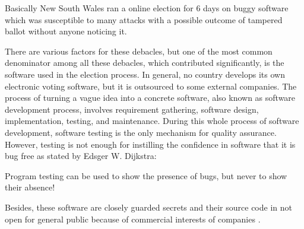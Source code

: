   \noindent
  Basically New South Wales ran a online election for 6 days on 
  buggy software which was susceptible to many attacks with a possible 
  outcome of tampered ballot without anyone noticing it. 
%  
%   
   
   There are various factors for these debacles, but one of the most 
   common denominator among all these debacles,
   which contributed significantly,  is the software used in the election process. 
   In general, no country develops its own electronic voting software, but it is outsourced 
   to some external companies.  The process of turning a vague idea into a 
   concrete software, also known as software development process, involves 
   requirement gathering, software design, implementation, testing, and maintenance. 
   During this whole process of software development, software testing is the only 
   mechanism for quality assurance. However, testing is not enough for 
   instilling the confidence in software that it is bug free 
   as stated by Edsger W. Dijkstra:
   \begin{displayquote}
   Program testing can be used to show the presence of bugs, 
    but never to show their absence!
   \end{displayquote}
    Besides, these software 
    are closely guarded secrets and their source 
   code in not open for general public because of commercial 
   interests of companies \citep{AEC}. 
   
